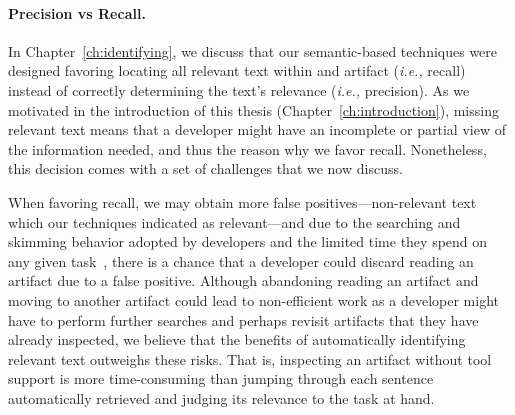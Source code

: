 \paragraph{\textbf{Precision vs Recall.}}

In Chapter~\ref{ch:identifying}, we discuss that our semantic-based techniques were designed favoring locating all relevant text within and
artifact (\textit{i.e.,} recall) instead of 
correctly determining the text's relevance (\textit{i.e.,} precision). 
As we motivated in the introduction of this thesis (Chapter~\ref{ch:introduction}),
missing relevant text means that a developer might have an incomplete or partial view of the information needed,
and thus the reason why we favor recall. 
Nonetheless, this decision comes with a set of challenges that we now discuss.



When favoring recall,  we may obtain more false positives---non-relevant text which our techniques indicated as relevant---and
due to the searching and skimming behavior adopted by developers and the limited time they spend on any given task~\cite{Starke2009}, there is a chance that
 a developer could discard reading an artifact due to a false positive. 
 Although abandoning reading an artifact and moving to another artifact could lead to non-efficient work 
as a developer might have to perform further searches and perhaps revisit artifacts that they have already inspected,
we believe that the benefits of automatically identifying relevant text outweighs these risks. 
That is, inspecting an artifact without tool support is more time-consuming
than jumping through each sentence automatically retrieved and judging its relevance to the task at hand. 









